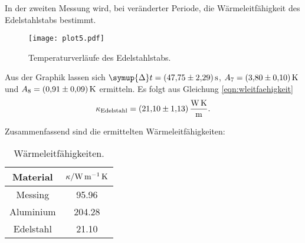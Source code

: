 %
In der zweiten Messung wird, bei veränderter Periode, die Wärmeleitfähigkeit
des Edelstahlstabs bestimmt.
%
\begin{figure}[H]
    \centering
    \texttt{[image: plot5.pdf]}
    \caption{Temperaturverläufe des Edelstahlstabs.}
    \label{fig:plot5}
\end{figure}
%
Aus der Graphik lassen sich $\symup{\Delta} t = \SI{47.75\pm2.29}{\second}$, $A_7 = \SI{3.80\pm0.10}{\kelvin}$
und $A_8 = \SI{0.91\pm0.09}{\kelvin}$ ermitteln.
Es folgt aus Gleichung \eqref{eqn:wleitfaehigkeit}
\begin{equation*}
  \kappa_\text{Edelstahl} =\SI{21.10\pm 1.13}{\watt\per\meter\kelvin} .
\end{equation*}

Zusammenfassend sind die ermittelten Wärmeleitfähigkeiten:
\begin{table}[H]
    \centering
    \caption{Wärmeleitfähigkeiten.}
    \label{tab:t2}
    \begin{tabular}{c S}
        \toprule
        {Material}  & {$\kappa/\si[per-mode=reciprocal]{\watt\per\meter\kelvin}$} \\
        \midrule
        Messing     & 95.96 \\
        Aluminium   & 204.28 \\
        Edelstahl   & 21.10\\
        \bottomrule
    \end{tabular}
\end{table}
